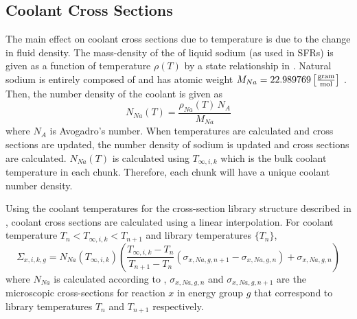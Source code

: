  \subsection{Coolant Cross Sections}
    The main effect on coolant cross sections due to temperature is due to the
    change in fluid density. The mass-density of the of liquid sodium (as used 
    in SFRs) is given as a function of temperature $\rho(T)$ by a state 
    relationship in \cite{sodiumProp}. Natural sodium is entirely composed of 
     and has atomic weight ${M_{Na} = 22.989769
    \left[\text{{$\frac{\text{gram}}{\text{mol}}$}}\right]}$ \cite{nuclides}.
    Then, the number density of the coolant is given as
    \begin{equation}
      \label{eq:number_density_sodium}
      N_{Na}(T) = \frac{\rho_{Na}(T) \, N_A}{M_{Na}}
    \end{equation}
    where $N_A$ is Avogadro's number. When temperatures are calculated and
    cross sections are updated, the number density of sodium is updated and
    cross sections are calculated. $N_{Na}(T)$ is calculated using
    $T_{\infty,i,k}$ which is the bulk coolant temperature in each chunk.
    Therefore, each chunk will have a unique coolant number density.
    

    Using the coolant temperatures for the cross-section library structure
    described in , coolant cross sections are
    calculated using a linear interpolation. For coolant temperature
    $T_{n}<T_{\infty,i,k}<T_{n+1}$ and library temperatures $\{T_n\}$,
    \begin{equation}
      \label{eq:xs_cool}
      \Sigma_{x,i,k,g} = N_{Na}(T_{\infty,i,k}) 
        \left( \frac{T_{\infty,i,k} - T_{n}}{T_{n+1}-T_{n}} 
        (\sigma_{x,Na,g,n+1} - \sigma_{x,Na,g,n})  + \sigma_{x,Na,g,n}\right)
    \end{equation}
    where $N_{Na}$ is calculated according to ,
    $\sigma_{x,Na,g,n}$ and $\sigma_{x,Na,g,n+1}$ are the microscopic 
    cross-sections for reaction $x$ in energy group $g$ that correspond to 
    library temperatures $T_n$ and $T_{n+1}$ respectively.

